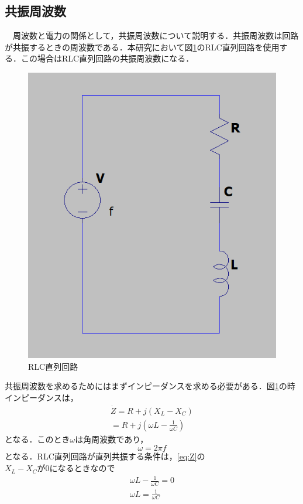 \documentclass[12pt]{jarticle}
\begin{document}
\subsection{共振周波数}
　周波数と電力の関係として，共振周波数について説明する．共振周波数は回路が共振するときの周波数である．本研究において図\ref{fig:RLC}のRLC直列回路を使用する．この場合はRLC直列回路の共振周波数になる．
\begin{figure}[H]
	\centering
	\includegraphics[scale=0.5]{RLC.png}
	\caption{RLC直列回路}
	\label{fig:RLC}
\end{figure}
共振周波数を求めるためにはまずインピーダンスを求める必要がある．図\ref{fig:RLC}の時インピーダンスは，
\begin{eqnarray}
\label{eq:Z}
\dot{Z}=R+j(X_L-X_C) \nonumber\\
=R+j(\omega L-\frac{1}{\omega C})
\end{eqnarray}
となる．このとき$\omega$は角周波数であり，
\begin{equation}
\label{eq:omega}
\omega=2 \pi f
\end{equation}
となる．RLC直列回路が直列共振する条件は，\ref{eq:Z}の$X_L-X_Cが0になるときなので$
\begin{eqnarray}
\omega L-\frac{1}{\omega C}=0　\nonumber \\
\label{eq:zyouken}
\omega L=\frac{1}{\omega C}
\end{eqnarray}
\end{document}
